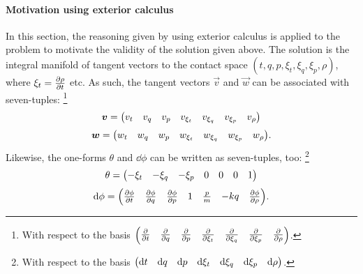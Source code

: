 \paragraph{Motivation using exterior calculus}
In this section, the reasoning given by \citet{Burke1985} using exterior calculus is applied to the problem to motivate the validity of the solution given above. The solution is the integral manifold of tangent vectors to the contact space $(t, q, p, \xi_t, \xi_q, \xi_p, \rho)$, where $\xi_t = \pdv{\rho}{t}$ etc. As such, the tangent vectors $\vec{v}$ and $\vec{w}$ can be associated with seven-tuples:
\footnote{With respect to the basis $\mqty(\pdv{}{t} & \pdv{}{q} & \pdv{}{p} & \pdv{}{\xi_t} & \pdv{}{\xi_q} & \pdv{}{\xi_p} & \pdv{}{\rho})$.}
$$\vec{v} = \mqty(v_t & v_q & v_p & v_{\xi_t} & v_{\xi_q} & v_{\xi_p} & v_{\rho})$$
$$\vec{w} = \mqty(w_t & w_q & w_p & w_{\xi_t} & w_{\xi_q} & w_{\xi_p} & w_{\rho}).$$
Likewise, the one-forms $\theta$ and $\dd{\phi}$ can be written as seven-tuples, too:
\footnote{With respect to the basis $\mqty(\dd{t} & \dd{q} & \dd{p} & \dd{\xi_t} & \dd{\xi_q} & \dd{\xi_p} & \dd{\rho})$.}
$$\theta = \mqty(-\xi_t & -\xi_q & -\xi_p & 0 & 0 & 0 & 1)$$
$$\dd{\phi} = \mqty(\pdv{\phi}{t} & \pdv{\phi}{q} & \pdv{\phi}{p} & 1 & \frac{p}{m} & -kq & \pdv{\phi}{\rho}).$$

